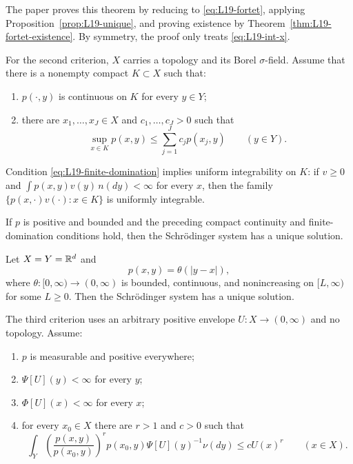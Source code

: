 The paper proves this theorem by reducing to \eqref{eq:L19-fortet}, applying Proposition~\ref{prop:L19-unique}, and proving existence by Theorem~\ref{thm:L19-fortet-existence}.  By symmetry, the proof only treats \eqref{eq:L19-int-x}.

For the second criterion, $X$ carries a topology and its Borel $\sigma$-field.  Assume that there is a nonempty compact $K\subset X$ such that:
\begin{enumerate}[label=(\alph*),leftmargin=2em]
\item $p(\cdot,y)$ is continuous on $K$ for every $y\in Y$;
\item there are $x_1,\dots,x_J\in X$ and $c_1,\dots,c_J>0$ such that
\begin{equation}\label{eq:L19-finite-domination}
 \sup_{x\in K}p(x,y)\le\sum_{j=1}^Jc_jp(x_j,y)
 \qquad(y\in Y).
\end{equation}
\end{enumerate}
Condition \eqref{eq:L19-finite-domination} implies uniform integrability on $K$: if $v\ge0$ and $\int p(x,y)v(y)\,n(dy)<\infty$ for every $x$, then the family $\{p(x,\cdot)v(\cdot):x\in K\}$ is uniformly integrable.

\begin{theorem}\label{thm:L19-topological}
If $p$ is positive and bounded and the preceding compact continuity and finite-domination conditions hold, then the Schr\"odinger system has a unique solution.
\end{theorem}

\begin{corollary}\label{cor:L19-radial}
Let $X=Y=\mathbb{R}^d$ and
\[
 p(x,y)=\theta(|y-x|),
\]
where $\theta:[0,\infty)\to(0,\infty)$ is bounded, continuous, and nonincreasing on $[L,\infty)$ for some $L\ge0$.  Then the Schr\"odinger system has a unique solution.
\end{corollary}

The third criterion uses an arbitrary positive envelope $U:X\to(0,\infty)$ and no topology.  Assume:
\begin{enumerate}[label=(\alph*),leftmargin=2em]
\item $p$ is measurable and positive everywhere;
\item $\Psi[U](y)<\infty$ for every $y$;
\item $\Phi[U](x)<\infty$ for every $x$;
\item for every $x_0\in X$ there are $r>1$ and $c>0$ such that
\begin{equation}\label{eq:L19-holder-condition}
 \int_Y\left(\frac{p(x,y)}{p(x_0,y)}\right)^r
 p(x_0,y)\Psi[U](y)^{-1}\nu(dy)
 \le cU(x)^r
 \qquad(x\in X).
\end{equation}
\end{enumerate}

